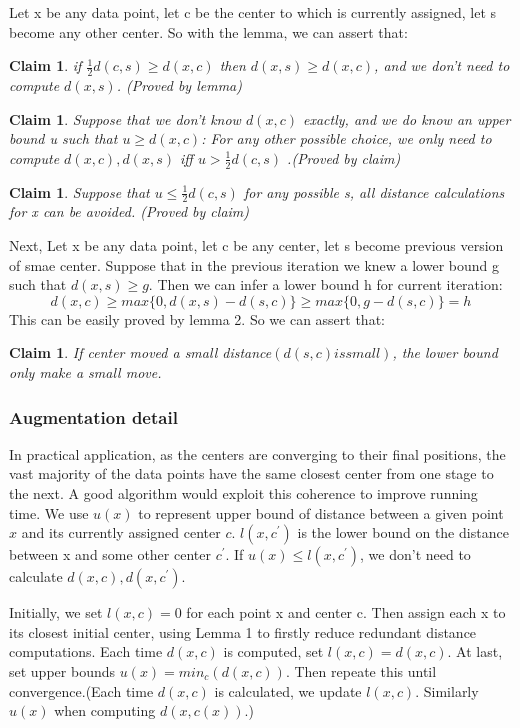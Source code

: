 \documentclass[11pt]{article}
\newtheorem{claim}[theorem]{Claim}
\begin{document}
Let x be any data point, let c be the center to which is currently assigned, let s become any other center. So with the lemma, we can assert that:
\begin{claim}
if $\frac{1}{2}d(c, s) \ge d(x,c)$ then $d(x, s) \ge d(x, c)$, and we don't need to compute $d(x,s)$. (Proved by lemma)
\end{claim}
\begin{claim}
Suppose that we don't know $d(x,c)$ exactly, and we do know an upper bound u such that $u \ge d(x,c)$: For any other possible choice, we only need to compute $d(x, c), d(x, s)$ iff $u > \frac{1}{2}d(c, s)$ .(Proved by claim)
\end{claim}
\begin{claim}
Suppose that $u \le \frac{1}{2}d(c, s)$ for any possible s, all distance calculations for x can be avoided. (Proved by claim)
\end{claim}

Next, Let x be any data point, let c be any center, let s become previous version of smae center. Suppose that in the previous iteration we knew a lower bound g such that $d(x, s) \ge g$. Then we can infer a lower bound h for current iteration:
$$
d(x, c) \ge max\{0, d(x,s)-d(s,c)\} \ge max\{0, g-d(s,c)\} = h
$$
This can be easily proved by lemma 2. So we can assert that:
\begin{claim}
If center moved a small distance$(d(s,c) is small)$, the lower bound only make a small move.
\end{claim}

\subsubsection{Augmentation detail}
In practical application, as the centers are converging to their final positions, the vast majority of the data points have the same closest center from one stage to the next. A good algorithm would exploit this coherence to improve running time. We use $u(x)$ to represent upper bound of distance between a given point $x$ and its currently assigned center $c$. $l(x,c^{\prime})$ is the lower bound on the distance between x and some other center $c^{\prime}$. If $u(x) \le l(x,c^{\prime}) $, we don't need to calculate $d(x,c), d(x, c^{\prime})$. \par
Initially, we set $l(x,c)=0$ for each point x and center c. Then assign each x to its closest initial center, using Lemma 1 to firstly reduce redundant distance computations. Each time $d(x,c)$ is computed, set $l(x,c)=d(x,c)$. At last, set upper bounds $u(x) = min_c(d(x,c))$. Then repeate this until convergence.(Each time $d(x,c)$ is calculated, we update $l(x,c)$. Similarly $u(x)$ when computing $d(x,c(x))$.)
\end{document}
